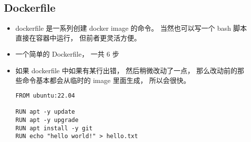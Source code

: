 \subsection{Dockerfile}
\begin{itemize}
\item dockerfile 是一系列创建 docker image 的命令。 当然也可以写一个 bash 脚本直接在容器中运行， 但前者更灵活方便。
\item 一个简单的 Dockerfile， 一共 6 步
\item 如果 dockerfile 中如果有某行出错， 然后稍微改动了一点， 那么改动前的那些命令基本都会从临时的 image 里面生成， 所以会很快。
\begin{lstlisting}[language=none]
FROM ubuntu:22.04

RUN apt -y update
RUN apt -y upgrade
RUN apt install -y git
RUN echo "hello world!" > hello.txt


\end{lstlisting}
\end{itemize}
